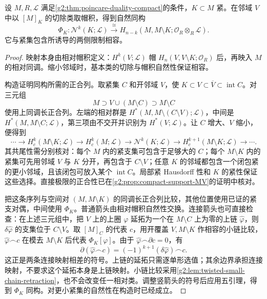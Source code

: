 \begin{lemma}\label{g2:lem:neighborhood-duality}
	设 \(M,R,\mathcal L\) 满足\cref{g2:thm:poincare-duality-compact}的条件，\(K\subset M\) 紧。在邻域 \(V\) 中以 \([M]_K\) 的切除类取帽积，得到自然同构
	\begin{equation}\label{g2:eq:neighborhood-duality}
		\Phi_K:\mathcal N^k(K;\mathcal L)\xrightarrow{\ \cong\ }
		H_{n-k}(M,M\setminus K;\mathcal O_R\otimes_R\mathcal L).
	\end{equation}
	它与紧集包含所诱导的两侧限制相容。
\end{lemma}
\begin{proof}
	映射本身由相对帽积定义：\(H^k(V;\mathcal L)\) 帽 \(H_n(V,V\setminus K;\mathcal O_R)\) 后，再映入 \(M\) 的相对同调。缩小邻域时，基本类的切除与帽积自然性保证相容。

	构造证明同构所需的正合列。取紧集 \(C\) 和开邻域 \(V\)，使 \(K\subset V\subset\overline V\subset\operatorname{int}C\)。对三元组
	\[
		M\supset V\cup(M\setminus C)\supset M\setminus C
	\]
	使用上同调长正合列。左端的相对群是 \(H^*(M,M\setminus(C\setminus V);\mathcal L)\)，中间是 \(H^*(M,M\setminus C;\mathcal L)\)，第三项由不交开并识别为 \(H^*(V;\mathcal L)\)。让 \(C\) 增大、\(V\) 缩小，便得到
	\[
		\cdots\to H_c^k(M\setminus K;\mathcal L)\to H_c^k(M;\mathcal L)
		\to\mathcal N^k(K;\mathcal L)\to H_c^{k+1}(M\setminus K;\mathcal L)\to\cdots.
	\]
	其共尾性需分别核对：每个 \(M\) 内的紧支集可包含于足够大的 \(C\)；每个 \(M\setminus K\) 内的紧集可先用邻域 \(V\) 与 \(K\) 分开，再包含于 \(C\setminus V\)；任意 \(K\) 的邻域都包含一个闭包紧的更小邻域，且该闭包可放入某个 \(\operatorname{int}C\)。局部紧 Hausdorff 性和 \(K\) 的紧性保证这些选择。直接极限的正合性已在\cref{g2:prop:compact-support-MV}的证明中核对。

	把这条序列与空间对 \((M,M\setminus K)\) 的同调长正合列比较，其他位置使用已证的紧支对偶，中间使用 \(\Phi_K\)。普通箭头由相对帽积自然性交换。连接箭头也可直接检查：在上述三元组中，把 \(V\) 上的上圈 \(\varphi\) 延拓为一个在 \(M\setminus C\) 上为零的上链 \(\widehat\varphi\)，则 \(\delta\widehat\varphi\) 的支集位于 \(C\setminus V\)。取 \([M]_C\) 的代表 \(c\)，用开覆盖 \(V,M\setminus K\) 作相容的小链比较，\(\widehat\varphi\frown c\) 在模去 \(M\setminus K\) 后代表 \(\Phi_K[\varphi]\)。由于 \(\widehat\varphi\frown\partial c=0\)，有
	\[
		\partial(\widehat\varphi\frown c)=(-1)^{k+1}(\delta\widehat\varphi)\frown c.
	\]
	这正是两条连接映射相差的符号。上链的延拓只需逐单形选值；其余边界承担连接映射，不要求这个延拓本身是上链映射。小链比较采用\cref{g2:lem:twisted-small-chain-retraction}，也不会改变任一相对类。调整竖箭头的符号后应用五引理，得到 \(\Phi_K\) 同构。对更小紧集的自然性在构造时已经成立。
\end{proof}

